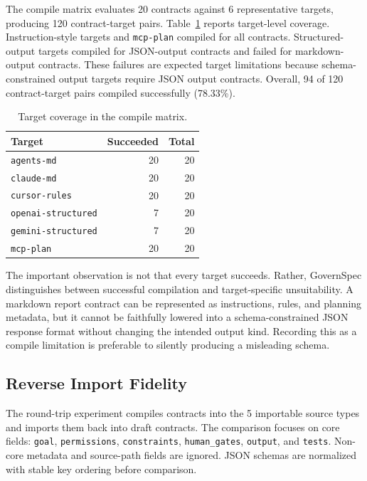 \documentclass[11pt]{article}
\begin{document}
The compile matrix evaluates 20 contracts against 6 representative targets, producing
120 contract-target pairs. Table~\ref{tab:compile} reports target-level coverage.
Instruction-style targets and \texttt{mcp-plan} compiled for all contracts.
Structured-output targets compiled for JSON-output contracts and failed for
markdown-output contracts. These failures are expected target limitations because
schema-constrained output targets require JSON output contracts. Overall, 94 of 120
contract-target pairs compiled successfully (78.33\%).

\begin{table}[htbp]
\caption{Target coverage in the compile matrix.}
\label{tab:compile}
\centering
\begin{tabular}{lrr}
\toprule
Target & Succeeded & Total \\
\midrule
\texttt{agents-md} & 20 & 20 \\
\texttt{claude-md} & 20 & 20 \\
\texttt{cursor-rules} & 20 & 20 \\
\texttt{openai-structured} & 7 & 20 \\
\texttt{gemini-structured} & 7 & 20 \\
\texttt{mcp-plan} & 20 & 20 \\
\bottomrule
\end{tabular}
\end{table}

The important observation is not that every target succeeds. Rather, GovernSpec
distinguishes between successful compilation and target-specific unsuitability. A
markdown report contract can be represented as instructions, rules, and planning
metadata, but it cannot be faithfully lowered into a schema-constrained JSON
response format without changing the intended output kind. Recording this as a
compile limitation is preferable to silently producing a misleading schema.

\subsection{Reverse Import Fidelity}

The round-trip experiment compiles contracts into the 5 importable source types and
imports them back into draft contracts. The comparison focuses on core fields:
\texttt{goal}, \texttt{permissions}, \texttt{constraints}, \texttt{human\_gates},
\texttt{output}, and \texttt{tests}. Non-core metadata and source-path fields are
ignored. JSON schemas are normalized with stable key ordering before comparison.
\end{document}
